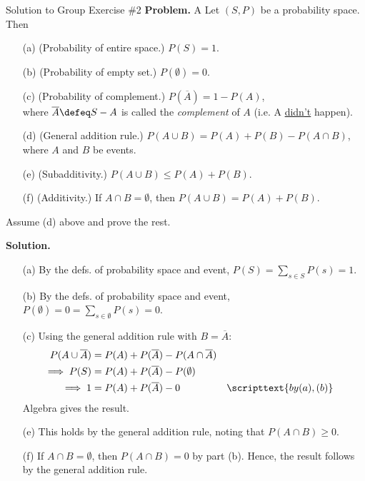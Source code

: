 \documentclass[10pt]{beamer}
\begin{document}
\begin{frame}{Solution to Group Exercise \#2}
\scriptsize  
 \colorbox{blue!30}{\textbf{Problem.}} A Let $(S,P)$ be a probability space. Then
\begin{itemize}
	\item[(a)] (Probability of entire space.) $P(S)=1$. 
	\item[(b)] (Probability of empty set.)  $P(\emptyset)=0$. 
	\item[(c)] (Probability of complement.) $P(\overline{A}) = 1-P(A)$, \\
		where $\overline{A} \defeq S-A$ is called the \textit{complement} of $A$ (i.e. A \underline{didn't} happen).
	\item[(d)]  (General addition rule.)  $P(A \cup B) = P(A) + P(B) - P(A \cap B)$, \\
	where $A$ and $B$ be events.
	\item[(e)] (Subadditivity.) $P(A \cup B) \leq P(A) + P(B)$. 
	\item[(f)] (Additivity.) If $A \cap B = \emptyset$, then  $P(A \cup B) = P(A) + P(B)$.
\end{itemize}
Assume (d) above and prove the rest.

 \vfill
  \colorbox{green!30}{\textbf{Solution.}}
 \begin{itemize}
	\item[(a)]  By the defs. of probability space and event, $P(S)= \sum_{s \in S} P(s) = 1.$ 
	\item[(b)]  By the defs. of probability space and event,  $P(\emptyset)=0 = \sum_{s \in \emptyset} P(s) = 0$. 
	\item[(c)] Using the general addition rule with $B=\overline{A}$:
	\begin{align*}
	P(A \cup \overline{A}) &= P(A) + P(\overline{A}) - P(A \cap \overline{A}) \\
	\implies P(S) &= P(A) + P(\overline{A}) - P(\emptyset) \\
	\implies 1 &= P(A) + P(\overline{A}) - 0 && \scripttext{by (a), (b)}
	\end{align*}
	Algebra gives the result.
	\item[(e)] This holds by the general addition rule, noting that $P(A \cap B) \geq 0$.
	\item[(f)] If $A \cap B = \emptyset$, then $P(A \cap B) =0$ by part (b).  Hence, the result follows by the general addition rule.
\end{itemize}

\end{frame}
\end{document}
